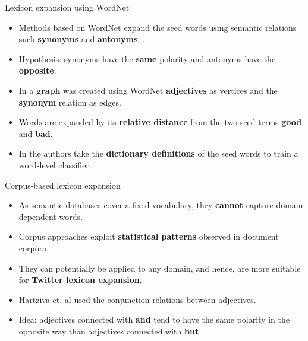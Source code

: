 \begin{frame}{Lexicon expansion using WordNet}
\begin{scriptsize}

\begin{itemize} 
\item Methods based on WordNet expand the seed words using semantic relations such \textbf{synonyms} and \textbf{antonyms}, \cite{Liu2004,Kim2004}.
\item Hypothesis: synonyms have the \textbf{same} polarity and antonyms have the \textbf{opposite}.
\item In \cite{kamps2004} a \textbf{graph} was created using WordNet \textbf{adjectives} as vertices and the \textbf{synonym} relation as edges. 
\item Words are expanded by its \textbf{relative distance} from the two seed terms \textbf{good} and \textbf{bad}.
\item In \cite{Esuli2005, esuli2006} the authors take the \textbf{dictionary definitions} of the seed words to train a word-level classifier. 
\end{itemize}
\end{scriptsize}
\end{frame}






\begin{frame}{Corpus-based lexicon expansion}
\begin{scriptsize}
\begin{itemize}
\item As semantic databases cover a fixed vocabulary, they \textbf{cannot} capture domain dependent words. 
\item Corpus approaches exploit \textbf{statistical patterns} observed in document corpora. 
\item They can potentially be applied to any domain, and hence, are more suitable for \textbf{Twitter lexicon expansion}.  
\item Hartziva et. al \cite{Hatziva1997} used the  conjunction relations between adjectives.
\item Idea: adjectives connected with \textbf{and} tend to have the same polarity in the opposite way than adjectives connected with \textbf{but}.
\end{itemize}
\end{scriptsize}
\end{frame}

